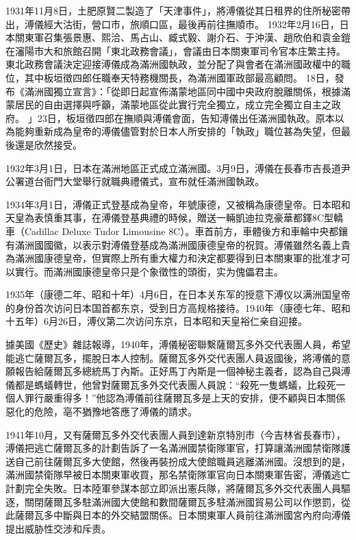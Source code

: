 1931年11月8日，土肥原賢二製造了「天津事件」，將溥儀從其日租界的住所秘密帶出，溥儀經大沽街，營口市，旅順口區，最後再前往撫順市。 1932年2月16日，日本關東軍召集張景惠、熙洽、馬占山、臧式毅、謝介石、于沖漢、趙欣伯和袁金鎧在瀋陽市大和旅館召開「東北政務會議」，會議由日本關東軍司令官本庄繁主持。東北政務會議決定迎接溥儀成為滿洲國執政，並分配了與會者在滿洲國政權中的職位，其中板垣徵四郎任職奉天特務機關長，為滿洲國軍政部最高顧問。 18日，發布《滿洲國獨立宣言》：「從即日起宣佈滿蒙地區同中國中央政府脫離關係，根據滿蒙居民的自由選擇與呼籲，滿蒙地區從此實行完全獨立，成立完全獨立自主之政府。 」23日，板垣徵四郎在撫順與溥儀會面，告知溥儀出任滿洲國執政。原本以為能夠重新成為皇帝的溥儀儘管對於日本人所安排的「執政」職位甚為失望，但最後還是欣然接受。

1932年3月1日，日本在滿洲地區正式成立滿洲國。3月9日，溥儀在長春市吉長道尹公署道台衙門大堂舉行就職典禮儀式，宣布就任滿洲國執政。

1934年3月1日，溥儀正式登基成為皇帝，年號康德，又被稱為康德皇帝。日本昭和天皇為表慎重其事，在溥儀登基典禮的時候，贈送一輛凱迪拉克豪華都鐸8C型轎車（Cadillac Deluxe Tudor Limousine 8C）。車首前方，車體後方和車輪中央都鑲有滿洲國國徽，以表示對溥儀登基成為滿洲國康德皇帝的祝賀。溥儀雖然名義上貴為滿洲國康德皇帝，但實際上所有重大權力和決定都要得到日本關東軍的批准才可以實行。而滿洲國康德皇帝只是个象徵性的頭銜，实为傀儡君主。

1935年（康德二年、昭和十年）4月6日，在日本关东军的授意下溥仪以满洲国皇帝的身份首次访问日本国首都东京，受到日方高规格接待。1940年（康德七年、昭和十五年）6月26日，溥仪第二次访问东京，日本昭和天皇裕仁亲自迎接。

據美國《歷史》雜誌報導，1940年，溥儀秘密聯繫薩爾瓦多外交代表團人員，希望能逃亡薩爾瓦多，擺脫日本人控制。薩爾瓦多外交代表團人員返國後，將溥儀的意願報告給薩爾瓦多總統馬丁內斯。正好馬丁內斯是一個神秘主義者，認為自己與溥儀都是螞蟻轉世，他曾對薩爾瓦多外交代表團人員說：“殺死一隻螞蟻，比殺死一個人罪行嚴重得多！”他認為溥儀前往薩爾瓦多是上天的安排，便不顧與日本關係惡化的危險，亳不猶豫地答應了溥儀的請求。

1941年10月，又有薩爾瓦多外交代表團人員到達新京特別市（今吉林省長春市），溥儀把逃亡薩爾瓦多的計劃告訴了一名滿洲國禁衛隊軍官，打算讓滿洲國禁衛隊護送自己前往薩爾瓦多大使館，然後再裝扮成大使館職員逃離滿洲國。沒想到的是，滿洲國禁衛隊早被日本關東軍收買，那名禁衛隊軍官向日本關東軍告密，溥儀逃亡計劃完全失敗。日本陸軍參謀本部立即派出憲兵隊，將薩爾瓦多外交代表團人員驅逐，關閉薩爾瓦多駐滿洲國大使館和數間薩爾瓦多駐滿洲國貿易公司以作懲罰，從此薩爾瓦多中斷與日本的外交結盟關係。日本關東軍人員前往滿洲國宮內府向溥儀提出威胁性交涉和斥责。

